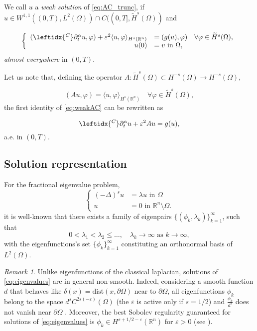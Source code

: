 \documentclass{amsart}
\newcommand{\rn}{{\mathbb{R}^n}}
\newcommand{\phii}{\varphi}
\newcommand{\ele}{L^2(\Omega)}
\newcommand{\pp}{\overline{\partial}}
\newcommand{\ppa}{\leftidx{^C}\partial_t^\alpha}
\newcommand{\W}{\Omega}
\newcommand{\eps}{\varepsilon}
\newcommand{\hsT}{\widetilde{H}^s (\W)}
\newcommand{\hmsT}{H^{-s} (\W)}
\newcommand{\fmonio}{g}
\theoremstyle{remark}
\newtheorem{remark}[theorem]{Remark}
\theoremstyle{definition}
\numberwithin{equation}{section}
\begin{document}
We call $u$ a \emph{weak solution} of \eqref{eq:AC_trunc}, if 
$u \in W^{1,1}((0,T),\ele)\cap C((0,T],\hsT)$ and  
   
\begin{equation}
\label{eq:weakAC}
\left\lbrace
  \begin{array}{rl}      
 (\ppa u,\phii) + \eps^2\langle u , \phii \rangle_{H^s(\rn)}  & = (\fmonio(u),\phii) \quad \forall \phii \in \hsT, \\
 u(0)  & = v  \text{ in } \Omega, 
\end{array}
    \right.
\end{equation}
\emph{almost everywhere} in $(0,T)$. 

Let us note that, defining the operator $A: \hsT \subset \hmsT \to \hmsT$,

\begin{equation}
\label{eq:weakOperator}
(Au,\phii) = \langle u , \phii \rangle_{H^s(\rn)} \quad \forall \phii \in \hsT,
\end{equation}
the first identity of \eqref{eq:weakAC} can be rewritten as 

\begin{equation}
\ppa u + \eps^2Au = \fmonio(u),
\label{eq:weakAC2}
\end{equation}
a.e. in $(0,T)$.


\subsection{Solution representation}
For the  fractional eigenvalue problem, 
\begin{equation}
\left\lbrace
  \begin{array}{rl}      
   (-\Delta)^s u  & = \lambda u \text{ in } \Omega \\
u & =  0  \text{ in }    \mathbb{R}^n \setminus \Omega.
\end{array}
    \right.
\label{eq:eigenvalues}
\end{equation}
it is well-known that there exists a family of eigenpairs  $\{(\phi_k, \lambda_k) \}_{k=1}^\infty$, such that  
$$0 < \lambda_1 < \lambda_2 \le \ldots , \quad \lambda_k \to \infty \mbox{ as } k\to \infty ,
$$
with the eigenfunctions's set $\{ \phi_k \}_{k = 1}^\infty$ constituting an orthonormal basis of $L^2(\W)$. 
\begin{remark}
Unlike eigenfunctions of the classical laplacian, solutions of \eqref{eq:eigenvalues} are in general non-smooth. Indeed, considering a smooth function  $d$ that behaves like $\delta(x)=\text{dist}(x,\partial \W)$ near to $\pp\W$, all eigenfunctions $\phi_k$ belong to the space $d^sC^{2s(-\eps)}(\W)$ (the $\eps$ is active only if $s=1/2$) and  $\frac{\phi_k}{d^s}$ does not vanish near $\partial\W$ \cite{grubb_autovalores, RosOtonSerra2}. Moreover,  
the best Sobolev regularity guaranteed for solutions of \eqref{eq:eigenvalues} is $\phi_k \in H^{s + 1/2 - \eps}(\rn)$ for $\eps>0$ (see \cite{BdPM}).
\end{remark}
\end{document}
